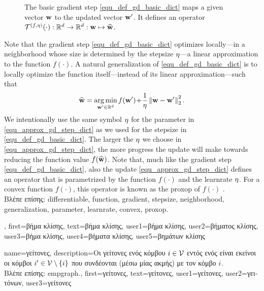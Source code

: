 {{\begin{figure}[H]
			\caption{The basic \gls{gradient} step \eqref{equ_def_gd_basic_dict} maps a given vector ${\bf w}$ 
			to the updated vector ${\bf w}'$. It defines an operator 
			$\mathcal{T}^{(f,\eta)}(\cdot): \mathbb{R}^{d} \rightarrow \mathbb{R}^{d}:
			 {\bf w} \mapsto \widehat{{\bf w}}$.}
			\label{fig_basic_GD_step_single_dict}
		\end{figure}
		Note that the \gls{gradient} step \eqref{equ_def_gd_basic_dict} optimizes locally—in a \gls{neighborhood} whose 
		size is determined by the \gls{stepsize} $\eta$—a linear approximation 
		to the \gls{function} $f(\cdot)$. A natural \gls{generalization} of \eqref{equ_def_gd_basic_dict} is to locally 
		optimize the \gls{function} itself—instead of its linear approximation—such that
		\begin{align} 
		\label{equ_approx_gd_step_dict}
		\widehat{{\bf w}} = \operatorname*{arg\,min}_{{\bf w}' \in \mathbb{R}^{d}} f({\bf w}')\!+\!\frac{1}{\eta}\left\Vert {{\bf w}-{\bf w}'} \right\Vert_{2}^2. 
		\end{align}
		We intentionally use the same symbol $\eta$ for the \gls{parameter} in \eqref{equ_approx_gd_step_dict} 
		as we used for the \gls{stepsize} in \eqref{equ_def_gd_basic_dict}. The larger the $\eta$ we choose in 
		\eqref{equ_approx_gd_step_dict}, the more progress the update will make towards reducing the 
		\gls{function} value $f(\widehat{{\bf w}})$. Note that, much like the \gls{gradient} step \eqref{equ_def_gd_basic_dict}, 
		also the update \eqref{equ_approx_gd_step_dict} defines an operator 
		that is parametrized by the \gls{function} $f(\cdot)$ and the \gls{learnrate} $\eta$. For a \gls{convex} \gls{function} 
		$f(\cdot)$, this operator is known as the \gls{proxop} of $f(\cdot)$ \cite{ProximalMethods}.\\ 
		\foreignlanguage{greek}{Βλέπε επίσης:} \gls{differentiable}, \gls{function}, \gls{gradient}, \gls{stepsize}, \gls{neighborhood}, \gls{generalization}, 
		\gls{parameter}, \gls{learnrate}, \gls{convex}, \gls{proxop}.},
	first={\foreignlanguage{greek}{βήμα κλίσης}},
	text={\foreignlanguage{greek}{βήμα κλί\-σης}},
	user1={\foreignlanguage{greek}{βήμα κλίσης}}, %
	user2={\foreignlanguage{greek}{βήματος κλίσης}}, %
	user3={\foreignlanguage{greek}{βήμα κλίσης}}, %
	user4={\foreignlanguage{greek}{βήματα κλίσης}}, %
	user5={\foreignlanguage{greek}{βημάτων κλίσης}} %
}

{name={\foreignlanguage{greek}{γείτονες}},
	description={\foreignlanguage{greek}{Οι γείτονες ενός κόμβου} 
		$i \in \mathcal{V}$ \foreignlanguage{greek}{εντός ενός}  
		\foreignlanguage{greek}{είναι εκείνοι οι κόμβοι $i' \in \mathcal{V} \setminus \{ i\}$ 
		που συνδέονται (μέσω μίας ακμής) με τον κόμβο} $i$.\\
		\foreignlanguage{greek}{Βλέπε επίσης:} \gls{empgraph}.},
	first={\foreignlanguage{greek}{γείτονες}},
	text={\foreignlanguage{greek}{γείτονες}},
	user1={\foreignlanguage{greek}{γείτονες}}, %
   	user2={\foreignlanguage{greek}{γειτόνων}}, %
	user3={\foreignlanguage{greek}{γείτονες}} %
}

